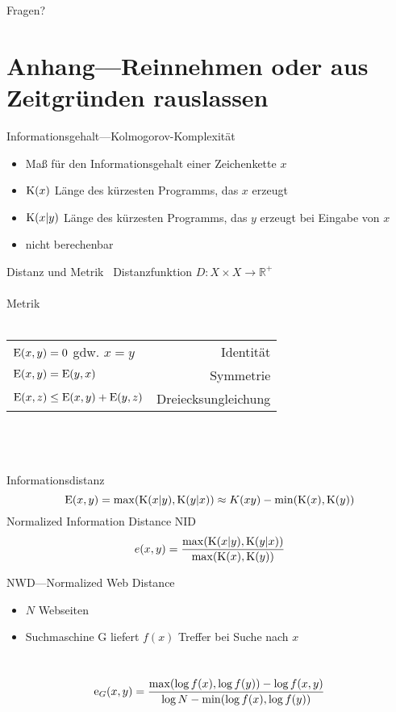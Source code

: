 \documentclass[aspectratio=1610,handout]{beamer}
\newcommand{\K}[1]{\textnormal{K}{(#1)}}
\newcommand{\E}[1]{\textnormal{E}{(#1)}}
\newcommand{\D}[1]{\textnormal{E}{(#1)}}
\newcommand{\f}[1]{\ensuremath{f(#1)}}
\begin{document}
\begin{frame}{Fragen?}
\end{frame}

\section{Anhang---Reinnehmen oder aus Zeitgründen rauslassen}

\begin{frame}{Informationsgehalt---Kolmogorov-Komplexität}
\begin{itemize}
\item Maß für den Informationsgehalt einer Zeichenkette $x$
\item $\K{x}$ Länge des kürzesten Programms, das $x$ erzeugt
\item $\K{x|y}$ Länge des kürzesten Programms, das $y$ erzeugt bei Eingabe von $x$
\item nicht berechenbar
\end{itemize}
\end{frame}

\begin{frame}{Distanz und Metrik~\cite{normalizedinformationdistance}}
Distanzfunktion $D: X \times  X \rightarrow \mathbb{R}^+$\\
\pause
~\\
Metrik\\~\\
\begin{tabular}{lr}
$\D{x,y} = 0$ gdw. $x = y$			&Identität\\
$\D{x,y} = \D{y,x}$					&Symmetrie\\
$\D{x,z} \leq \D{x,y} + \D{y,z}$	&Dreiecksungleichung\\
\end{tabular}\\
\pause
~\\~\\Informationsdistanz
\[\E{x,y} = \max(\K{x|y},\K{y|x}) \approx K(xy) - \min(\K{x},\K{y}) \]
\pause
Normalized Information Distance NID\\
\[e(x,y) = \frac{\max(\K{x|y},\K{y|x})}{\max(\K{x},\K{y})} \]
\end{frame}

\begin{frame}{NWD---Normalized Web Distance}
\begin{itemize}
\item $N$ Webseiten
\item Suchmaschine G liefert $\f{x}$ Treffer bei Suche nach $x$
\end{itemize}
~\\
\[\textnormal{e}_G(x,y) = \frac
{\max(\log \f{x}, \log \f{y})- \log \f{x,y}}
{\log N - \min(\log \f{x}, \log \f{y})}
\]
\end{frame}
\end{document}
